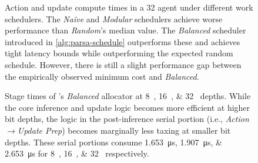 \begin{figure}
	\caption[Action and update compute times in a \qty{32}{\bit} \Coopfw{} agent under different work schedulers.]{Action and update compute times in a \qty{32}{\bit} \Coopfw{} agent under different work schedulers. The \emph{Na\"{i}ve} and \emph{Modular} schedulers achieve worse performance than \emph{Random}'s median value. The \emph{Balanced} scheduler introduced in \cref{alg:parsa-schedule} outperforms these and achieves tight latency bounds while outperforming the expected random schedule. However, there is still a slight performance gap between the empirically observed minimum cost and \emph{Balanced}.\label{fig:work-alloc-32}}
\end{figure}

\begin{figure}
	\caption[Stage times of \approachshort's \emph{Balanced} allocator at \qtylist{8;16;32}{\bit} depths.]{Stage times of \approachshort's \emph{Balanced} allocator at \qtylist{8;16;32}{\bit} depths. While the core inference and update logic becomes more efficient at higher bit depths, the logic in the post-inference serial portion (i.e., \emph{Action}$\rightarrow$\emph{Update Prep}) becomes marginally less taxing at smaller bit depths. These serial portions consume \qtylist{1.653;1.907;2.653}{\micro\second} for \qtylist{8;16;32}{\bit} respectively.\label{fig:work-alloc-allbit}}
\end{figure}


